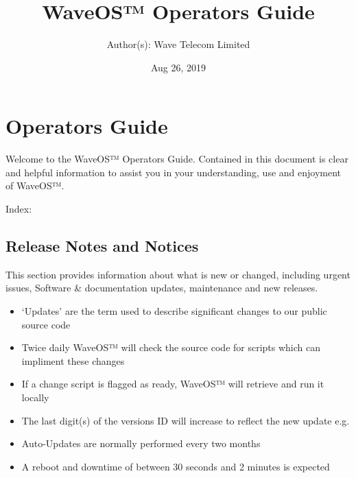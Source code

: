 \documentclass[letterpaper,10pt,openany,oneside,english]{sphinxmanual}
\title{WaveOS™ Operators Guide}
\date{Aug 26, 2019}
\author{Author(s): Wave Telecom Limited}
\begin{document}
\maketitle
\sphinxtableofcontents
{}\label{\detokenize{index::doc}}



\chapter{Operators Guide}
\label{\detokenize{index:operators-guide}}
Welcome to the WaveOS™ Operators Guide. Contained in this document is clear and helpful information to assist you in your understanding, use and enjoyment of WaveOS™.

Index:


\section{Release Notes and Notices}
\label{\detokenize{releasenotes:release-notes-and-notices}}\label{\detokenize{releasenotes::doc}}
This section provides information about what is new or changed, including urgent issues, Software \& documentation updates, maintenance and new releases.
\begin{itemize}
\item {} 
‘Updates’ are the term used to describe significant changes to our public source code

\item {} 
Twice daily WaveOS™ will check the source code for scripts which can impliment these changes

\item {} 
If a change script is flagged as ready, WaveOS™ will retrieve and run it locally

\item {} 
The last digit(s) of the versions ID will increase to reflect the new update e.g. 

\item {} 
Auto-Updates are normally performed every two months

\item {} 
A reboot and downtime of between 30 seconds and 2 minutes is expected

\end{itemize}
\end{document}
